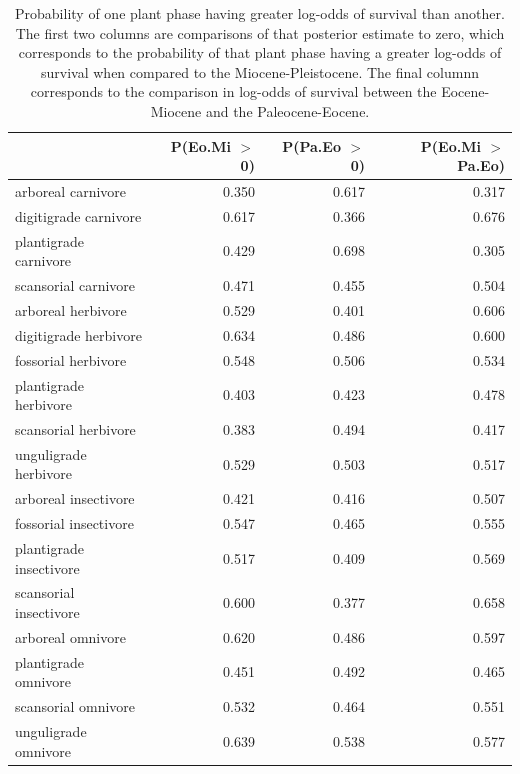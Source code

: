 \documentclass[12pt,letterpaper]{article}
\begin{document}
\begin{table}[ht]
  \centering
  \caption[Posterior probablity estimates of differences in survival by plant phase]{Probability of one plant phase having greater log-odds of survival than another. The first two columns are comparisons of that posterior estimate to zero, which corresponds to the probability of that plant phase having a greater log-odds of survival when compared to the Miocene-Pleistocene. The final columnn corresponds to the comparison in log-odds of survival between the Eocene-Miocene and the Paleocene-Eocene.} 
  \label{tab:surv_plant}
  \begin{tabular}{ l r r r }
    \hline
    & P(Eo.Mi $>$ 0) & P(Pa.Eo $>$ 0) & P(Eo.Mi $>$ Pa.Eo) \\ 
    \hline
    arboreal carnivore & 0.350 & 0.617 & 0.317 \\ 
    digitigrade carnivore & 0.617 & 0.366 & 0.676 \\ 
    plantigrade carnivore & 0.429 & 0.698 & 0.305 \\ 
    scansorial carnivore & 0.471 & 0.455 & 0.504 \\ 
    arboreal herbivore & 0.529 & 0.401 & 0.606 \\ 
    digitigrade herbivore & 0.634 & 0.486 & 0.600 \\ 
    fossorial herbivore & 0.548 & 0.506 & 0.534 \\ 
    plantigrade herbivore & 0.403 & 0.423 & 0.478 \\ 
    scansorial herbivore & 0.383 & 0.494 & 0.417 \\ 
    unguligrade herbivore & 0.529 & 0.503 & 0.517 \\ 
    arboreal insectivore & 0.421 & 0.416 & 0.507 \\ 
    fossorial insectivore & 0.547 & 0.465 & 0.555 \\ 
    plantigrade insectivore & 0.517 & 0.409 & 0.569 \\ 
    scansorial insectivore & 0.600 & 0.377 & 0.658 \\ 
    arboreal omnivore & 0.620 & 0.486 & 0.597 \\ 
    plantigrade omnivore & 0.451 & 0.492 & 0.465 \\ 
    scansorial omnivore & 0.532 & 0.464 & 0.551 \\ 
    unguligrade omnivore & 0.639 & 0.538 & 0.577 \\ 
    \hline
  \end{tabular}
\end{table}
\end{document}
